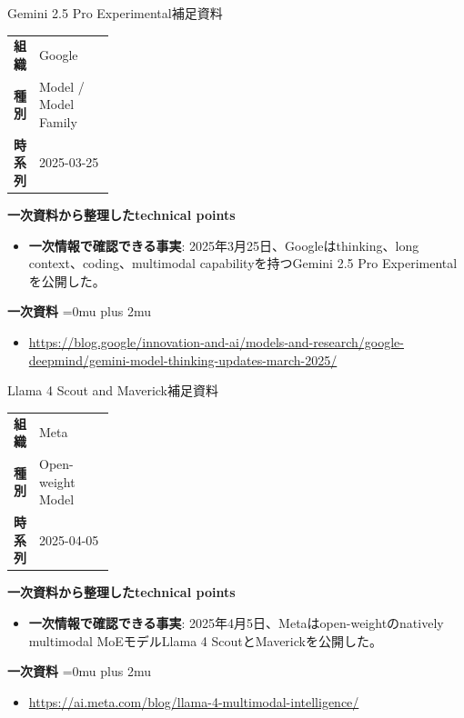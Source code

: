 \begin{technicalnote}{Gemini 2.5 Pro Experimental}{補足資料}
\begingroup
\begin{tabularx}{\linewidth}{@{}>{\bfseries}p{0.22\linewidth}X@{}}
組織 & Google \\
種別 & Model / Model Family \\
時系列 & 2025-03-25 \\
\end{tabularx}
\smallskip
{\bfseries 一次資料から整理したtechnical points}
\begin{itemize}[leftmargin=1.5em,itemsep=0.35em]
\item \textbf{一次情報で確認できる事実}: 2025年3月25日、Googleはthinking、long context、coding、multimodal capabilityを持つGemini 2.5 Pro Experimentalを公開した。
\end{itemize}
\begin{samepage}
{\bfseries 一次資料}
\begingroup\sloppy
\Urlmuskip=0mu plus 2mu\relax
\begin{itemize}[leftmargin=1.5em,itemsep=0.25em]
\item {\scriptsize\url{https://blog.google/innovation-and-ai/models-and-research/google-deepmind/gemini-model-thinking-updates-march-2025/}}
\end{itemize}
\endgroup
\end{samepage}
\endgroup
\end{technicalnote}
\medskip

\begin{technicalnote}{Llama 4 Scout and Maverick}{補足資料}
\begingroup
\begin{tabularx}{\linewidth}{@{}>{\bfseries}p{0.22\linewidth}X@{}}
組織 & Meta \\
種別 & Open-weight Model \\
時系列 & 2025-04-05 \\
\end{tabularx}
\smallskip
{\bfseries 一次資料から整理したtechnical points}
\begin{itemize}[leftmargin=1.5em,itemsep=0.35em]
\item \textbf{一次情報で確認できる事実}: 2025年4月5日、Metaはopen-weightのnatively multimodal MoEモデルLlama 4 ScoutとMaverickを公開した。
\end{itemize}
\begin{samepage}
{\bfseries 一次資料}
\begingroup\sloppy
\Urlmuskip=0mu plus 2mu\relax
\begin{itemize}[leftmargin=1.5em,itemsep=0.25em]
\item {\scriptsize\url{https://ai.meta.com/blog/llama-4-multimodal-intelligence/}}
\end{itemize}
\endgroup
\end{samepage}
\endgroup
\end{technicalnote}
\medskip

